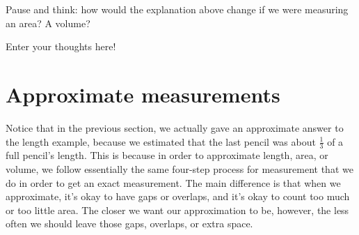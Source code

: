 \documentclass{ximera}
\begin{document}
\begin{question}
Pause and think: how would the explanation above change if we were measuring an area? A volume?
\begin{freeResponse} Enter your thoughts here! \end{freeResponse}
\end{question}

\section{Approximate measurements}

Notice that in the previous section, we actually gave an approximate answer to the length example, because we estimated that the last pencil was about $\frac13$ of a full pencil's length. This is because in order to approximate length, area, or volume, we follow essentially the same four-step process for measurement that we do in order to get an exact measurement. The main difference is that when we approximate, it's okay to have gaps or overlaps, and it's okay to count too much or too little area. The closer we want our approximation to be, however, the less often we should leave those gaps, overlaps, or extra space.
\end{document}
